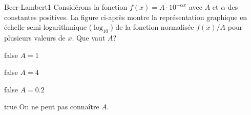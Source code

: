 \documentclass[11pt]{article}
\begin{document}
        \begin{question}{27}{Beer-Lambert}{1}{}
            Considérons la fonction $f(x) = A\cdot 10^{-\alpha x}$ avec $A$ et $\alpha$ des constantes positives. La figure ci-après montre la représentation graphique en échelle semi-logarithmique ($\log_{10}$) de la fonction normalisée $f(x)/A$ pour plusieurs valeurs de $x$. Que vaut $A$?
            \begin{figure}
             \end{figure}
        \end{question}
        \begin{reponses}
            \item[false] $A = 1$
		    \item[false] $A = 4$
		    \item[false] $A = \num{0.2}$
		    \item[true] On ne peut pas connaître $A$.
		    \end{reponses}
		
	
	
\end{document}
